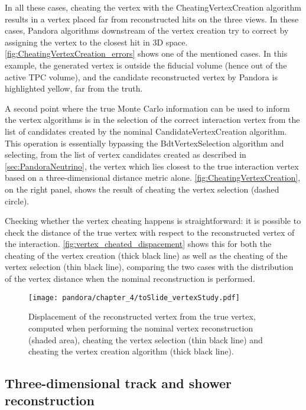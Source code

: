 In all these cases, cheating the vertex with the CheatingVertexCreation algorithm results in a vertex placed far from reconstructed hits on the three views. In these cases, Pandora algorithms downstream of the vertex creation try to correct by assigning the vertex to the closest hit in 3D space. \autoref{fig:CheatingVertexCreation_errors} shows one of the mentioned cases. In this example, the generated vertex is outside the fiducial volume (hence out of the active TPC volume), and the candidate reconstructed vertex by Pandora is highlighted yellow, far from the truth. 

A second point where the true Monte Carlo information can be used to inform the vertex algorithms is in the selection of the correct interaction vertex from the list of candidates created by the nominal CandidateVertexCreation algorithm. This operation is essentially bypassing the BdtVertexSelection algorithm and selecting, from the list of vertex candidates created as described in \autoref{sec:PandoraNeutrino}, the vertex which lies closest to the true interaction vertex based on a three-dimensional distance metric alone. \autoref{fig:CheatingVertexCreation}, on the right panel, shows the result of cheating the vertex selection (dashed circle). 

Checking whether the vertex cheating happens is straightforward: it is possible to check the distance of the true vertex with respect to the reconstructed vertex of the interaction. \autoref{fig:vertex_cheated_dispacement} shows this for both the cheating of the vertex creation (thick black line) as well as the cheating of the vertex selection (thin black line), comparing the two cases with the distribution of the vertex distance when the nominal reconstruction is performed. 

\begin{figure}
    \centering
    \texttt{[image: pandora/chapter\_4/toSlide\_vertexStudy.pdf]}
    \caption[Vertex displacement from truth]{Displacement of the reconstructed vertex from the true vertex, computed when performing the nominal vertex reconstruction (shaded area), cheating the vertex selection (thin black line) and cheating the vertex creation algorithm (thick black line). }
    \label{fig:vertex_cheated_dispacement}
\end{figure}


\subsection{Three-dimensional track and shower reconstruction}

